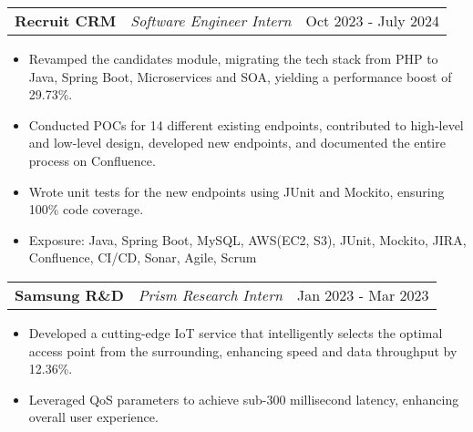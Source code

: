 \documentclass[a4paper,10pt]{article}
\makeatletter
\newenvironment{joblong}[3]
    {
    \begin{tabularx}{\linewidth}{@{}l X r@{}}
    \textbf{#1} & \textit{#2} &  #3 \\[3pt]
    \end{tabularx}
    \begin{minipage}[t]{\linewidth}
    \begin{itemize}[nosep,after=\strut, leftmargin=1em, itemsep=2pt,label=--]
    }
    {
    \end{itemize}
    \end{minipage}    
    }
\makeatother
\begin{document}
\begin{joblong}{Recruit CRM}{Software Engineer Intern}{Oct 2023 - July 2024}
    \item Revamped the candidates module, migrating the tech stack from PHP to Java, Spring Boot, Microservices and SOA, yielding a performance boost of 29.73\%.
    \item Conducted POCs for 14 different existing endpoints, contributed to high-level and low-level design, developed new endpoints, and documented the entire process on Confluence.
    \item Wrote unit tests for the new endpoints using JUnit and Mockito, ensuring 100\% code coverage.
    \item Exposure: Java, Spring Boot, MySQL, AWS(EC2, S3), JUnit, Mockito, JIRA, Confluence, CI/CD, Sonar, Agile, Scrum
\end{joblong}



\begin{joblong}{Samsung R\&D}{Prism Research Intern}{Jan 2023 - Mar 2023}
    \item Developed a cutting-edge IoT service that intelligently selects the optimal access point from the surrounding, enhancing speed and data throughput by 12.36\%.
    \item Leveraged QoS parameters to achieve sub-300 millisecond latency, enhancing overall user experience.
\end{joblong}
\vspace{-5pt}
\end{document}
